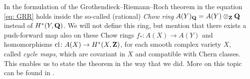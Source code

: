 
\begin{remark}
    In the formulation of the Grothendieck--Riemann--Roch theorem in \cite[\S 15, Theorem 15.2]{Fulton1998} the equation \eqref{eq: GRR} holds inside the so-called (rational) \emph{Chow ring} $A(Y)_\mathbf Q = A(Y) \otimes_{\mathbf Z} \mathbf Q$ instead of $H^{*}(Y, \mathbf Q)$. We will not define this ring, but mention that there exists a push-forward map also on these Chow rings $f_* \colon A(X) \to A(Y)$ and homomorphisms $\operatorname{cl} \colon A(X) \to H^{*}(X, \mathbf Z)$, for each smooth complex variety $X$, called \emph{cycle maps}, which are covariant in $X$ and compatible with Chern classes. This enables us to state the theorem in the way that we did. More on this topic can be found in \cite[\S 19]{Fulton1998}.
\end{remark}

